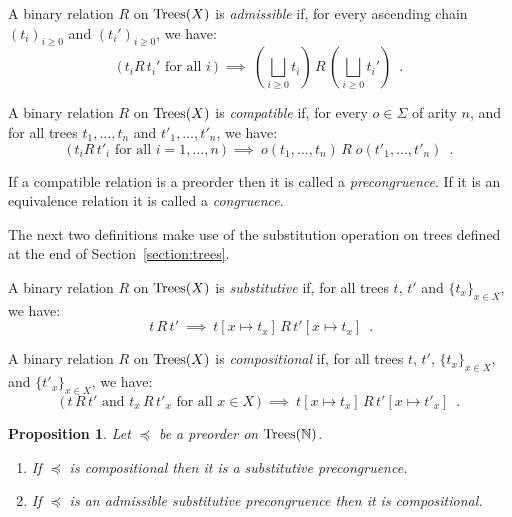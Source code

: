 \documentclass[a4paper,UKenglish]{lipics-v2018}
\newcommand{\Trees}{\textnormal{Trees}}
\newcommand{\Basicleq}{\preccurlyeq}
\theoremstyle{plain}
\newtheorem{proposition}[theorem]{Proposition}
\begin{document}
\begin{definition}[Admissibility]
    A binary relation $R$ on $\Trees(X)$ is \emph{admissible} if,
    for every ascending chain $(t_i)_{i \geq 0}$ and 
    $(t_i')_{i\geq 0}$, we have:
    \[ \text{($\,t_i  R \, t_i'$ for all $i\,$)} ~ \implies~
        \left(\bigsqcup_{i \geq 0} t_i\right) \, R \, \left(\bigsqcup_{i \geq 0} t_i'\right) \enspace .
    \]
\end{definition}

\begin{definition}[Compatibility]
    A binary relation $R$ on $\Trees(X)$ is  \emph{compatible} if,
    for every $o \in \Sigma$ of arity $n$, and for all trees 
     $t_1,\dots, t_n$ and $t'_1, \dots, t'_n$, we have:
    \[ \text{($\,t_i  R \, t'_i$ for all $i = 1, \dots, n\,$)} ~ \implies ~ 
        o(t_1, \dots, t_n) \, R \; o(t'_1, \dots, t'_n) \enspace .
    \]
\end{definition}
If a compatible relation is a preorder then it is called a \emph{precongruence}. If it is an equivalence relation it is called a \emph{congruence}.


The next two definitions make use of the substitution operation on trees defined at the end of
Section~\ref{section:trees}.
\begin{definition}[Substitutivity]
    A binary relation $R$ on $\Trees(X)$ is  \emph{substitutive} if,
    for all trees $t$, $t'$ and $\{t_x\}_{x \in X}$, we have:
    \[ \text{$\,t\, R \, t'$} ~ \implies ~ 
       t[ x \mapsto t_x] \, R \, t'[ x \mapsto t_x] \enspace .
    \]
\end{definition}



\begin{definition}[Compositionality]
    A binary relation $R$ on $\Trees(X)$ is \emph{compositional} if, for all 
    trees $t$, $t'$,  $\{t_x\}_{x \in X}$,  and $\{t'_x\}_{x \in X}$, we have:
        \[ \text{($\,t \, R \, t'$ and $t_x \, R \, t'_x$ for all $x \in X\,$)} ~ \implies ~ 
        t[ x \mapsto t_x] \, R \, t'[ x \mapsto t'_x] \enspace .
    \]
\end{definition}



\begin{proposition} 
\label{proposition:substitutive}
Let $\Basicleq$ be a preorder  on $\Trees(\mathbb{N})$.
\begin{enumerate} 
\item If  $\Basicleq$ is compositional then it is a substitutive precongruence.
\item If $\Basicleq$ is an admissible substitutive precongruence then it is compositional.
\end{enumerate}
\end{proposition}
\end{document}
